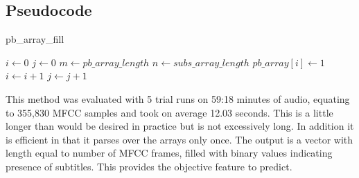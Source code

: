 \subsection{Pseudocode}
\begin{algorithm}
	\caption{pb\_array\_fill}\label{euclid}
	\begin{algorithmic}[1]
		\Procedure{}{}
		\State $i \gets 0$
		\State $j \gets 0$
		\State $m \gets pb\_array\_length$
		\State $n \gets subs\_array\_length$
			\BREAK
			\EndIf
			\BREAK
			\EndIf
				\State $pb\_array[i] \gets 1$
				\State $i \gets i+1$
				\EndIf
			\Else
				\State $j \gets j+1$
			\EndIf
		\EndIf
		\EndProcedure
	\end{algorithmic}
\end{algorithm}

This method was evaluated with 5 trial runs on 59:18 minutes of audio, equating to 355,830 MFCC samples and took on average 12.03 seconds. This is a little longer than would be desired in practice but is not excessively long. In addition it is efficient in that it parses over the arrays only once. The output is a vector with length equal to number of MFCC frames, filled with binary values indicating presence of subtitles. This provides the objective feature to predict.